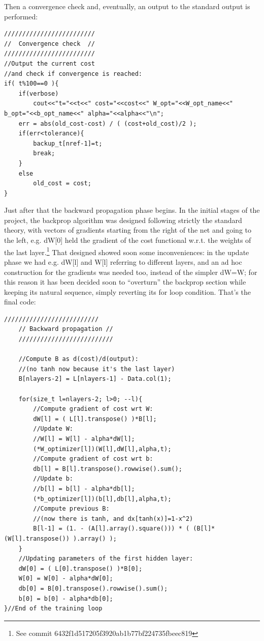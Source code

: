\documentclass[12pt, a4paper]{report}
\theoremstyle{definition}
\begin{document}
Then a convergence check and, eventually, an output to the standard output is performed:
\begin{lstlisting}[frame=single, showstringspaces=false]
/////////////////////////
//  Convergence check  //
/////////////////////////
//Output the current cost
//and check if convergence is reached:
if( t%100==0 ){
	if(verbose)
		cout<<"t="<<t<<" cost="<<cost<<" W_opt="<<W_opt_name<<" b_opt="<<b_opt_name<<" alpha="<<alpha<<"\n";
	err = abs(old_cost-cost) / ( (cost+old_cost)/2 );
	if(err<tolerance){
		backup_t[nref-1]=t;
		break;
	}
	else
		old_cost = cost;
}
\end{lstlisting}
Just after that the backward propagation phase begins. In the initial stages of the project, the backprop algorithm was designed following strictly the standard theory, with vectors of gradients starting from the right of the net and going to the left, e.g. {\ttfamily dW[0]} held the gradient of the cost functional w.r.t. the weights of the last layer.\footnote{See commit 6432f1d517205f3920ab1b77bf224735fbeec819} That designed showed soon some inconveniences: in the update phase we had e.g. {\ttfamily dW[l]} and {\ttfamily W[l]} referring to different layers, and an ad hoc construction for the gradients was needed too, instead of the simpler {\ttfamily dW=W}; for this reason it has been decided soon to ``overturn'' the backprop section while keeping its natural sequence, simply reverting its for loop condition. That's the final code:
\begin{lstlisting}[frame=single]
	//////////////////////////
	// Backward propagation //
	//////////////////////////
	
	//Compute B as d(cost)/d(output): 
	//(no tanh now because it's the last layer)
	B[nlayers-2] = L[nlayers-1] - Data.col(1);	

	for(size_t l=nlayers-2; l>0; --l){
		//Compute gradient of cost wrt W:
		dW[l] = ( L[l].transpose() )*B[l];
		//Update W:
		//W[l] = W[l] - alpha*dW[l];
		(*W_optimizer[l])(W[l],dW[l],alpha,t);
		//Compute gradient of cost wrt b:
		db[l] = B[l].transpose().rowwise().sum();
		//Update b:
		//b[l] = b[l] - alpha*db[l];
		(*b_optimizer[l])(b[l],db[l],alpha,t);
		//Compute previous B: 
		//(now there is tanh, and dx[tanh(x)]=1-x^2)
		B[l-1] = (1. - (A[l].array().square())) * ( (B[l]* (W[l].transpose()) ).array() );
	}
	//Updating parameters of the first hidden layer:
	dW[0] = ( L[0].transpose() )*B[0];
	W[0] = W[0] - alpha*dW[0];
	db[0] = B[0].transpose().rowwise().sum();
	b[0] = b[0] - alpha*db[0];
}//End of the training loop
\end{lstlisting}
\end{document}
